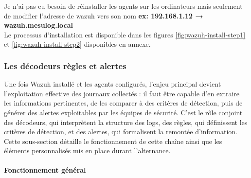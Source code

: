 \documentclass[a4paper, 11pt]{article}
\begin{document}
Je n'ai pas eu besoin de réinstaller les agents sur les ordinateurs mais seulement de modifier l'adresse de wazuh vers son nom \textbf{ex: 192.168.1.12 → wazuh.mesulog.local} \\ 

Le processus d'installation est disponible dans les figures \ref{fig:wazuh-install-step1} et \ref{fig:wazuh-install-step2} disponibles en annexe.

\subsubsection{Les décodeurs règles et alertes}

Une fois Wazuh installé et les agents configurés, l'enjeu principal devient l'exploitation effective des journaux collectés : 
il faut être capable d'en extraire les informations pertinentes, de les comparer à des critères de détection, puis de générer des
 alertes exploitables par les équipes de sécurité. C'est le rôle conjoint des décodeurs, qui interprètent la structure des logs,
  des règles, qui définissent les critères de détection, et des alertes, qui formalisent la remontée d'information. Cette sous-section
   détaille le fonctionnement de cette chaîne ainsi que les éléments personnalisés mis en place durant l'alternance.


\paragraph{Fonctionnement général}
\end{document}
